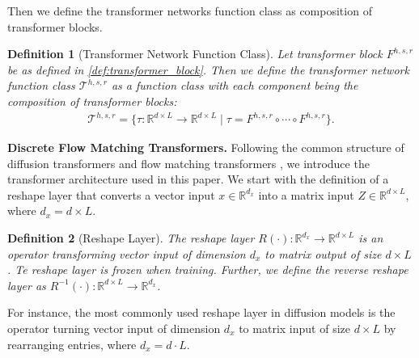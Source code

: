 \documentclass[12pt]{article}
\numberwithin{equation}{section}
\def\R{\mathbb{R}}
\let\cite\citep
\theoremstyle{theoremstyle}
\newtheorem{definition}{Definition}[section]
\numberwithin{equation}{section}
\numberwithin{theorem}{section}
\numberwithin{proposition}{section}
\numberwithin{definition}{section}
\numberwithin{lemma}{section}
\numberwithin{assumption}{section}
\numberwithin{remark}{section}
\begin{document}
Then we define the transformer networks function class as composition of transformer blocks.
\begin{definition}[Transformer Network Function Class]\label{def:transformer_network_function_class}
Let transformer block $F^{h,s,r}$ be as defined in \cref{def:transformer_block}.
Then we define the transformer network function class $\mathcal{T}^{h,s,r}$ as a function class with each component being the composition of transformer blocks:
\begin{align*}
    \mathcal{T}^{h,s,r}=\{\tau:\R^{d\times L}\to \R^{d\times L} \mid \tau=F^{h,s,r}\circ\cdots\circ F^{h,s,r}\}.
\end{align*}
\end{definition}

\textbf{Discrete Flow Matching Transformers.}
Following the common structure of diffusion transformers \cite{peebles2023scalable} and flow matching transformers \cite{su2025high}, we introduce the transformer architecture used in this paper.
We start with the definition of a reshape layer that converts a vector input $x \in \R^{d_x}$ into a matrix input $Z \in \R^{d \times L}$, where $d_x = d \times L$.

\begin{definition}[Reshape Layer]\label{def:reshape_layer}
The reshape layer $R(\cdot):\R^{d_x}\to \R^{d\times L}$ is an operator transforming vector input of dimension $d_x$ to matrix output of size $d\times L$.
Te reshape layer is frozen when training.
Further, we define the reverse reshape layer as $R^{-1}(\cdot):\R^{d\times L}\to \R^{d_x}$.
\end{definition}

For instance, the most commonly used reshape layer in diffusion models is the operator turning vector input of dimension $d_x$ to matrix input of size $d\times L$ by rearranging entries, where $d_x=d\cdot L$.
\end{document}

